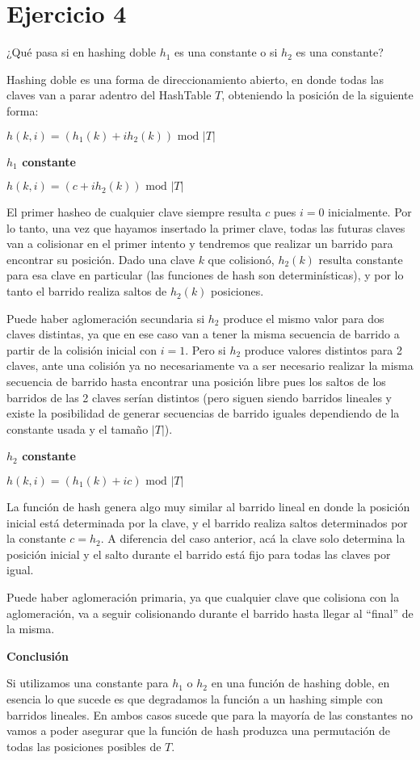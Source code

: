 \section*{Ejercicio 4}

¿Qué pasa si en hashing doble $h_1$ es una constante o si $h_2$ es una constante?

Hashing doble es una forma de direccionamiento abierto, en donde todas las claves van a parar adentro del HashTable $T$, obteniendo la posición de la siguiente forma:

$h(k, i) = (h_1(k) + i h_2(k)) \text{ mod } |T|$

\textbf{$h_1$ constante}

$h(k, i) = (c + i h_2(k)) \text{ mod } |T|$

El primer hasheo de cualquier clave siempre resulta $c$ pues $i=0$ inicialmente. Por lo tanto, una vez que hayamos insertado la primer clave, todas las futuras claves van a colisionar en el primer intento y tendremos que realizar un barrido para encontrar su posición. Dado una clave $k$ que colisionó, $h_2(k)$ resulta constante para esa clave en particular (las funciones de hash son determinísticas), y por lo tanto el barrido realiza saltos de $h_2(k)$ posiciones.

Puede haber aglomeración secundaria si $h_2$ produce el mismo valor para dos claves distintas, ya que en ese caso van a tener la misma secuencia de barrido a partir de la colisión inicial con $i=1$. Pero si $h_2$ produce valores distintos para 2 claves, ante una colisión ya no necesariamente va a ser necesario realizar la misma secuencia de barrido hasta encontrar una posición libre pues los saltos de los barridos de las 2 claves serían distintos (pero siguen siendo barridos lineales y existe la posibilidad de generar secuencias de barrido iguales dependiendo de la constante usada y el tamaño $|T|$).

\textbf{$h_2$ constante}

$h(k, i) = (h_1(k) + ic) \text{ mod } |T|$

La función de hash genera algo muy similar al barrido lineal en donde la posición inicial está determinada por la clave, y el barrido realiza saltos determinados por la constante $c = h_2$. A diferencia del caso anterior, acá la clave solo determina la posición inicial y el salto durante el barrido está fijo para todas las claves por igual.

Puede haber aglomeración primaria, ya que cualquier clave que colisiona con la aglomeración, va a seguir colisionando durante el barrido hasta llegar al ``final'' de la misma.

\textbf{Conclusión}

Si utilizamos una constante para $h_1$ o $h_2$ en una función de hashing doble, en esencia lo que sucede es que degradamos la función a un hashing simple con barridos lineales. En ambos casos sucede que para la mayoría de las constantes no vamos a poder asegurar que la función de hash produzca una permutación de todas las posiciones posibles de $T$.
